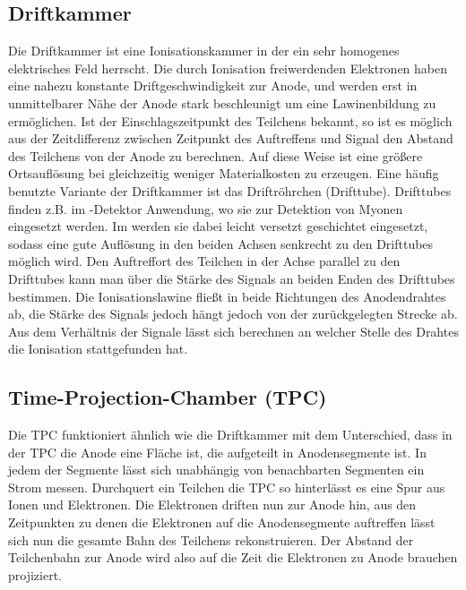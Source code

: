 \subsection{Driftkammer}
Die Driftkammer ist eine Ionisationskammer in der ein sehr homogenes elektrisches Feld herrscht. Die durch Ionisation freiwerdenden Elektronen haben eine nahezu konstante Driftgeschwindigkeit zur Anode, und werden erst in unmittelbarer Nähe der Anode stark beschleunigt um eine Lawinenbildung zu ermöglichen. Ist der Einschlagszeitpunkt des Teilchens bekannt, so ist es möglich aus der Zeitdifferenz zwischen Zeitpunkt des Auftreffens und Signal den Abstand des Teilchens von der Anode zu berechnen. Auf diese Weise ist eine größere Ortsauflösung bei gleichzeitig weniger Materialkosten zu erzeugen.
Eine häufig benutzte Variante der Driftkammer ist das Driftröhrchen (Drifttube). Drifttubes finden z.B. im \atlas-Detektor Anwendung, wo sie zur Detektion von Myonen eingesetzt werden. Im \atlas werden sie dabei leicht versetzt geschichtet eingesetzt, sodass eine gute Auflösung in den beiden Achsen senkrecht zu den Drifttubes möglich wird. Den Auftreffort des Teilchen in der Achse parallel zu den Drifttubes kann man über die Stärke des Signals an beiden Enden des Drifttubes bestimmen. Die Ionisationslawine fließt in beide Richtungen des Anodendrahtes ab, die Stärke des Signals jedoch hängt jedoch von der zurückgelegten Strecke ab. Aus dem Verhältnis der Signale lässt sich berechnen an welcher Stelle des Drahtes die Ionisation stattgefunden hat.
\subsection{Time-Projection-Chamber (TPC)}
Die TPC funktioniert ähnlich wie die Driftkammer mit dem Unterschied, dass in der TPC die Anode eine Fläche ist, die aufgeteilt in Anodensegmente ist. In jedem der Segmente lässt sich unabhängig von benachbarten Segmenten ein Strom messen. Durchquert ein Teilchen die TPC so hinterlässt es eine Spur aus Ionen und Elektronen. Die Elektronen driften nun zur Anode hin, aus den Zeitpunkten zu denen die Elektronen auf die Anodensegmente auftreffen lässt sich nun die gesamte Bahn des Teilchens rekonstruieren. Der Abstand der Teilchenbahn zur Anode wird also auf die Zeit die Elektronen zu Anode brauchen projiziert.
